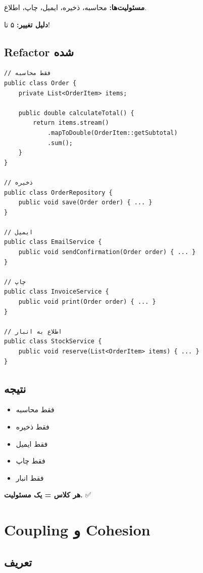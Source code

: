 \documentclass[12pt, a4paper]{article}
\begin{document}
\textbf{مسئولیت‌ها:} محاسبه، ذخیره، ایمیل، چاپ، اطلاع.

\textbf{دلیل تغییر:} ۵ تا!

\subsection{Refactor شده}

\begin{lstlisting}
// فقط محاسبه
public class Order {
    private List<OrderItem> items;
    
    public double calculateTotal() {
        return items.stream()
            .mapToDouble(OrderItem::getSubtotal)
            .sum();
    }
}

// ذخیره
public class OrderRepository {
    public void save(Order order) { ... }
}

// ایمیل
public class EmailService {
    public void sendConfirmation(Order order) { ... }
}

// چاپ
public class InvoiceService {
    public void print(Order order) { ... }
}

// اطلاع به انبار
public class StockService {
    public void reserve(List<OrderItem> items) { ... }
}
\end{lstlisting}

\subsection{نتیجه}

\begin{itemize}
    \item {} فقط محاسبه
    \item {} فقط ذخیره
    \item {} فقط ایمیل
    \item {} فقط چاپ
    \item {} فقط انبار
\end{itemize}

\textbf{هر کلاس = یک مسئولیت.} ✅

\section{Coupling و Cohesion}

\subsection{تعریف}
\end{document}
